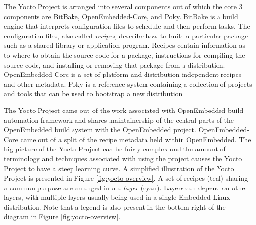 The Yocto Project is arranged into several components out of which the core 3 components are BitBake, OpenEmbedded-Core, and Poky. BitBake is a build engine that interprets configuration files to schedule and then perform tasks. The configuration files, also called  \textit{recipes}, describe how to build a particular package such as a shared library or application program. Recipes contain information as to where to obtain the source code for a package, instructions for compiling the source code, and installing or removing that package from a distribution. OpenEmbedded-Core is a set of platform and distribution independent recipes and other metadata. Poky is a reference system containing a collection of projects and tools that can be used to bootstrap a new distribution.

The Yocto Project came out of the work associated with OpenEmbedded build automation framework and shares maintainership of the central parts of the OpenEmbedded build system with the OpenEmbedded project. OpenEmbedded-Core came out of a split of the recipe metadata held within OpenEmbedded. The big picture of the Yocto Project can be fairly complex and the amount of terminology and techniques associated with using the project causes the Yocto Project to have a steep learning curve. A simplified illustration of the Yocto Project is presented in Figure \ref{fig:yocto-overview}. A set of recipes (teal) sharing a common purpose are arranged into a \textit{layer} (cyan). Layers can depend on other layers, with multiple layers usually being used in a single Embedded Linux distribution. Note that a legend is also present in the bottom right of the diagram in Figure \ref{fig:yocto-overview}.

